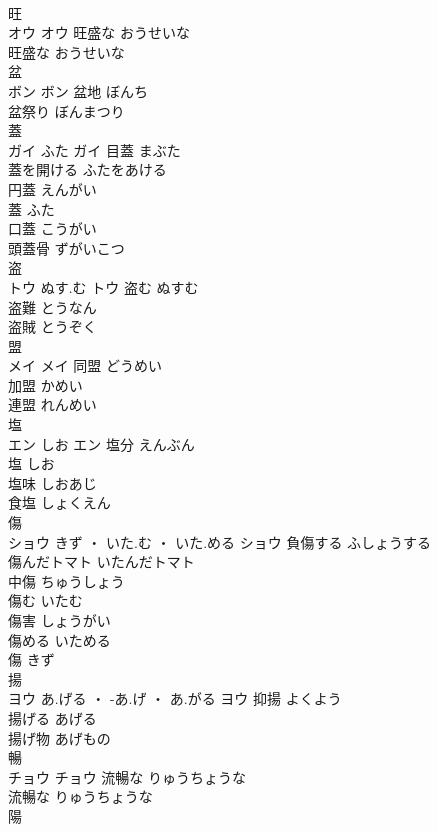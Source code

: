 \documentclass[8pt]{extreport}
\begin{document}
\begin{CJK}{UTF8}{min}
\\	旺	
\\	オウ		オウ	旺盛な	おうせいな	
\\	旺盛な	おうせいな	
\\	盆	
\\	ボン		ボン	盆地	ぼんち	
\\	盆祭り	ぼんまつり	
\\	蓋	
\\	ガイ	ふた	ガイ	目蓋	まぶた	
\\	蓋を開ける	ふたをあける	
\\	円蓋	えんがい	
\\	蓋	ふた	
\\	口蓋	こうがい	
\\	頭蓋骨	ずがいこつ	
\\	盗	
\\	トウ	ぬす.む	トウ	盗む	ぬすむ	
\\	盗難	とうなん	
\\	盗賊	とうぞく	
\\	盟	
\\	メイ		メイ	同盟	どうめい	
\\	加盟	かめい	
\\	連盟	れんめい	
\\	塩	
\\	エン	しお	エン	塩分	えんぶん	
\\	塩	しお	
\\	塩味	しおあじ	
\\	食塩	しょくえん	
\\	傷	
\\	ショウ	きず ・ いた.む ・ いた.める	ショウ	負傷する	ふしょうする	
\\	傷んだトマト	いたんだトマト	
\\	中傷	ちゅうしょう	
\\	傷む	いたむ	
\\	傷害	しょうがい	
\\	傷める	いためる	
\\	傷	きず	
\\	揚	
\\	ヨウ	あ.げる ・ -あ.げ ・ あ.がる	ヨウ	抑揚	よくよう	
\\	揚げる	あげる	
\\	揚げ物	あげもの	
\\	暢	
\\	チョウ		チョウ	流暢な	りゅうちょうな	
\\	流暢な	りゅうちょうな	
\\	陽	

\end{CJK}
\end{document}
